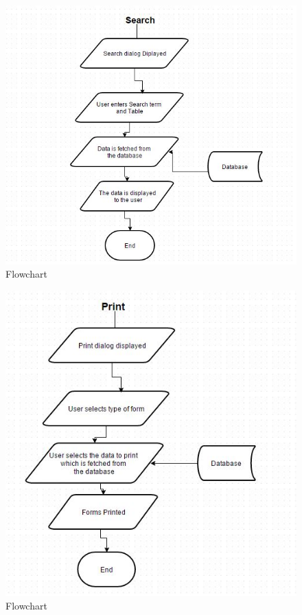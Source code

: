 \begin{figure}[H]
    \includegraphics[width=\textwidth]{DesignAlg6.JPG}
    \caption{Flowchart} \label{fig:Flowchart}
\end{figure}

\begin{figure}[H]
    \includegraphics[width=\textwidth]{DesignAlg7.JPG}
    \caption{Flowchart} \label{fig:Flowchart}
\end{figure}

